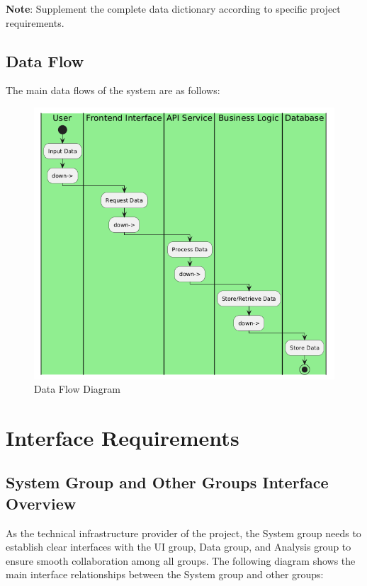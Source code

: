 \documentclass[a4paper,12pt]{article}
\begin{document}
\textbf{Note}: Supplement the complete data dictionary according to specific project requirements.

\subsection{Data Flow}

The main data flows of the system are as follows:

\begin{figure}[H]
    \centering
    \includegraphics[width=0.75\linewidth]{assets/6_EG.png}
    \caption{Data Flow Diagram}
    \label{fig:data-flow}
\end{figure}

\section{Interface Requirements}

\subsection{System Group and Other Groups Interface Overview}

As the technical infrastructure provider of the project, the System group needs to establish clear interfaces with the UI group, Data group, and Analysis group to ensure smooth collaboration among all groups. The following diagram shows the main interface relationships between the System group and other groups:
\end{document}
